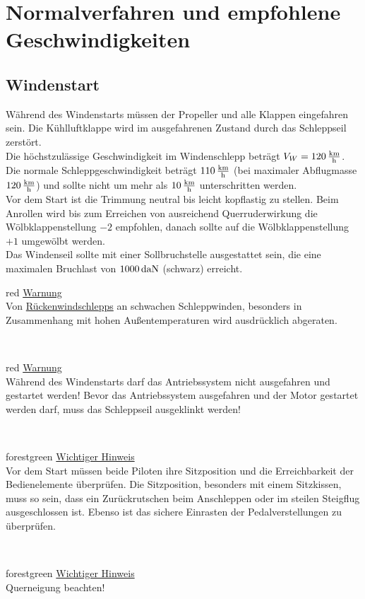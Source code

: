 \section{Normalverfahren und empfohlene Geschwindigkeiten}

\subsection{Windenstart}
Während des Windenstarts müssen der Propeller und alle Klappen eingefahren sein. Die Kühlluftklappe wird im ausgefahrenen Zustand durch das Schleppseil zerstört.\\

Die höchstzulässige Geschwindigkeit im Windenschlepp beträgt $V_W=\unit[120]{\frac{km}{h}}$. Die normale Schleppgeschwindigkeit beträgt $\unit[110]{\frac{km}{h}}$ (bei maximaler Abflugmasse $\unit[120]{\frac{km}{h}}$) und sollte nicht um mehr als $\unit[10]{\frac{km}{h}}$ unterschritten werden.\\
Vor dem Start ist die Trimmung neutral bis leicht kopflastig zu stellen. Beim Anrollen wird bis zum Erreichen von ausreichend Querruderwirkung die Wölbklappenstellung $-2$ empfohlen, danach sollte auf die Wölbklappenstellung $+1$ umgewölbt werden.\\
Das Windenseil sollte mit einer Sollbruchstelle ausgestattet sein, die eine maximalen Bruchlast von $\unit[1000]{daN}$ (schwarz) erreicht. \\
\newline
\begin{color}{red}
\large{\underline{Warnung}}\\
Von \underline{Rückenwindschlepps} an schwachen Schleppwinden, besonders in Zusammenhang mit hohen Außentemperaturen wird ausdrücklich abgeraten.
\end{color}\\
\newline
\begin{color}{red}
\large{\underline{Warnung}}\\
Während des Windenstarts darf das Antriebssystem nicht ausgefahren und gestartet werden! Bevor das Antriebssystem ausgefahren und der Motor gestartet werden darf, muss das Schleppseil ausgeklinkt werden!
\end{color}\\
\newline
\begin{color}{forestgreen}
\large{\underline{Wichtiger Hinweis}}\\
Vor dem Start müssen beide Piloten ihre Sitzposition und die Erreichbarkeit der 	Bedienelemente überprüfen. Die Sitzposition, besonders mit einem Sitzkissen, muss so sein, dass ein Zurückrutschen beim Anschleppen oder im steilen Steigflug ausgeschlossen ist. Ebenso ist das sichere Einrasten der Pedalverstellungen zu überprüfen.
\end{color}\\
\newline
\newline
\begin{color}{forestgreen}
\large{\underline{Wichtiger Hinweis}}\\
Querneigung beachten!
\end{color}\\
